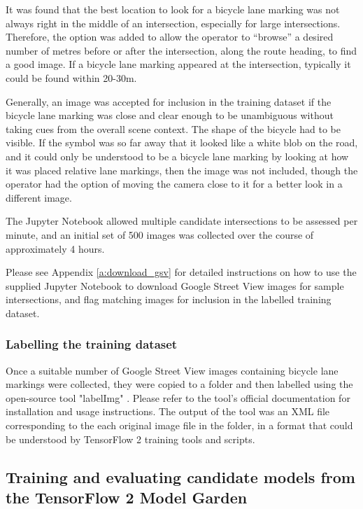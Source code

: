 \documentclass[11pt,twoside]{report}
\begin{document}
It was found that the best location to look for a bicycle lane marking was not always right in the middle of an intersection, especially for large intersections.  Therefore, the option was added to allow the operator to ``browse'' a desired number of metres before or after the intersection, along the route heading, to find a good image.  If a bicycle lane marking appeared at the intersection, typically it could be found within 20-30m.

Generally, an image was accepted for inclusion in the training dataset if the bicycle lane marking was close and clear enough to be unambiguous without taking cues from the overall scene context.  The shape of the bicycle had to be visible.  If the symbol was so far away that it looked like a white blob on the road, and it could only be understood to be a bicycle lane marking by looking at how it was placed relative lane markings, then the image was not included, though the operator had the option of moving the camera close to it for a better look in a different image.

The Jupyter Notebook allowed multiple candidate intersections to be assessed per minute, and an initial set of 500 images was collected over the course of approximately 4 hours.

Please see Appendix \ref{a:download_gsv} for detailed instructions on how to use the supplied Jupyter Notebook to download Google Street View images for sample intersections, and flag matching images for inclusion in the labelled training dataset.

\subsubsection{Labelling the training dataset}
\label{s:label}

Once a suitable number of Google Street View images containing bicycle lane markings were collected, they were copied to a folder and then labelled using the open-source tool "labelImg" \cite{labelImg}.  Please refer to the tool's official documentation for installation and usage instructions.  The output of the tool was an XML file corresponding to the each original image file in the folder, in a format that could be understood by TensorFlow 2 training tools and scripts.

\subsection{Training and evaluating candidate models from the TensorFlow 2 Model Garden}
\end{document}
